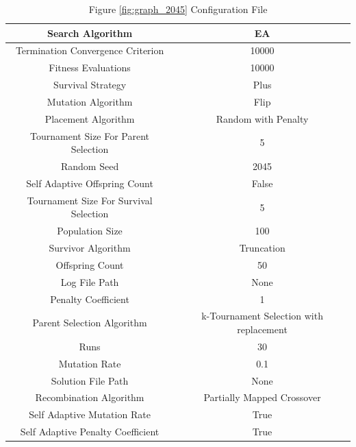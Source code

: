 \documentclass{standalone}
\begin{document}
\begin{table}[!htb]
	\centering
	\caption{Figure \ref{fig:graph_2045} Configuration File}
	\label{tab:graph_2045}
	\begin{tabular}{| c | c |}
		\hline
		Search Algorithm		& EA		 \\
		\hline
		Termination Convergence Criterion		& 10000		 \\
		\hline
		Fitness Evaluations		& 10000		 \\
		\hline
		Survival Strategy		& Plus		 \\
		\hline
		Mutation Algorithm		& Flip		 \\
		\hline
		Placement Algorithm		& Random with Penalty		 \\
		\hline
		Tournament Size For Parent Selection		& 5		 \\
		\hline
		Random Seed		& 2045		 \\
		\hline
		Self Adaptive Offspring Count		& False		 \\
		\hline
		Tournament Size For Survival Selection		& 5		 \\
		\hline
		Population Size		& 100		 \\
		\hline
		Survivor Algorithm		& Truncation		 \\
		\hline
		Offspring Count		& 50		 \\
		\hline
		Log File Path		& None		 \\
		\hline
		Penalty Coefficient		& 1		 \\
		\hline
		Parent Selection Algorithm		& k-Tournament Selection with replacement		 \\
		\hline
		Runs		& 30		 \\
		\hline
		Mutation Rate		& 0.1		 \\
		\hline
		Solution File Path		& None		 \\
		\hline
		Recombination Algorithm		& Partially Mapped Crossover		 \\
		\hline
		Self Adaptive Mutation Rate		& True		 \\
		\hline
		Self Adaptive Penalty Coefficient		& True		 \\
		\hline
	\end{tabular}
\end{table}
\end{document}
